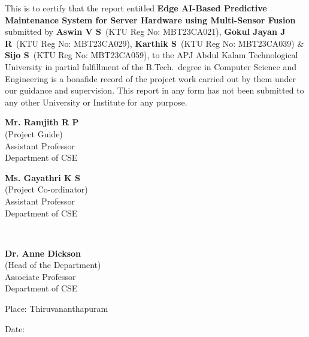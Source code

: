 \documentclass[12pt,a4paper]{report}
\begin{document}
This is to certify that the report entitled \textbf{Edge AI-Based Predictive Maintenance System for Server Hardware using Multi-Sensor Fusion} submitted by \textbf{Aswin V S}~(KTU Reg No: MBT23CA021), \textbf{Gokul Jayan J R}~(KTU Reg No: MBT23CA029), \textbf{Karthik S}~(KTU Reg No: MBT23CA039) \& \textbf{Sijo S}~(KTU Reg No: MBT23CA059), to the APJ Abdul Kalam Technological University in partial fulfillment of the B.Tech.\ degree in Computer Science and Engineering is a bonafide record of the project work carried out by them under our guidance and supervision. This report in any form has not been submitted to any other University or Institute for any purpose.
\vspace{0.5in}
\begin{singlespacing}
\hspace*{-0.25in}
\parbox{3in}{
  \noindent \textbf{Mr. Ramjith R P} \\
  \noindent (Project Guide) \\
  \noindent Assistant Professor\\
  \noindent Department of CSE\\
}
\hspace*{1in}
\parbox{2.5in}{
  \noindent \textbf{Ms. Gayathri K S} \\
  \noindent (Project Co-ordinator)\\
  \noindent Assistant Professor\\
  \noindent Department of CSE\\
}\\
\end{singlespacing}
\begin{singlespacing}
\hspace*{2in}
\parbox{2.5in}{
  \noindent \textbf{Dr. Anne Dickson} \\
  \noindent (Head of the Department)\\
  \noindent Associate Professor\\
  \noindent Department of CSE\\
}
\end{singlespacing}
\begin{singlespacing}
\vspace{0.2in}
\hspace*{-0.25in}
\parbox{2.5in}{\noindent Place: Thiruvananthapuram\\}
\hspace*{1.5in}
\parbox{2.5in}{\noindent Date:\\}
\end{singlespacing}
\clearpage
\end{document}
